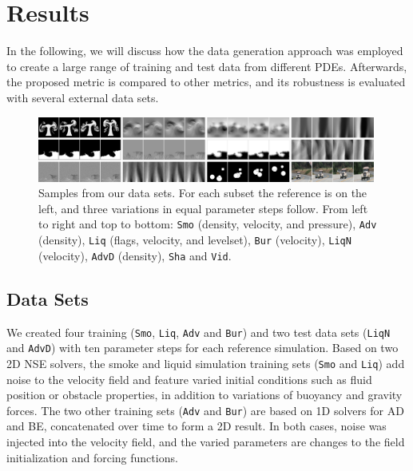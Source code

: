 \documentclass{article}
\begin{document}

\section{Results} \label{sec: results}
In the following, we will discuss how the data generation approach was employed to create a large range of training and test data from different PDEs. Afterwards, the proposed metric is compared to other metrics, and its robustness is evaluated with several external data sets.

\begin{figure}[bp]
    \centering
    \vspace{-0.2cm}
    \includegraphics[width=0.99\textwidth]{Images/DataExamples_small}
    \vspace{-0.35cm}
    \caption{Samples from our data sets. For each subset the reference is on the left, and three variations in equal parameter steps follow. From left to right and top to bottom: \texttt{Smo} (density, velocity, and pressure), \texttt{Adv} (density), \texttt{Liq} (flags, velocity, and levelset), \texttt{Bur} (velocity), \texttt{LiqN} (velocity), \texttt{AdvD} (density), \texttt{Sha} and \texttt{Vid}.}
    \label{fig: data examples}
\end{figure}

\subsection{Data Sets}
We created four training (\texttt{Smo}, \texttt{Liq}, \texttt{Adv} and \texttt{Bur}) and two test data sets (\texttt{LiqN} and \texttt{AdvD}) with ten parameter steps for each reference simulation. Based on two 2D NSE solvers, the smoke and liquid simulation training sets (\texttt{Smo} and \texttt{Liq}) add noise to the velocity field and feature varied initial conditions such as fluid position or obstacle properties, in addition to variations of buoyancy and gravity forces. 
The two other training sets (\texttt{Adv} and \texttt{Bur}) are based on 1D solvers for AD and BE, concatenated over time to form a 2D result. In both cases, noise was injected into the velocity field, and the varied parameters are changes to the field initialization and forcing functions. 
\end{document}
